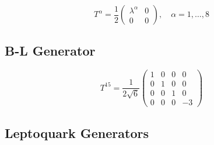 \documentclass[11pt,a4paper]{article}
\theoremstyle{definition}
\begin{document}
\begin{equation}
  \label{eq:su3-embedded}
  T^{\alpha} = \frac{1}{2} \begin{pmatrix} \lambda^{\alpha} & 0 \\ 0 & 0 \end{pmatrix}, \quad \alpha = 1, \ldots, 8
\end{equation}

\subsection{B-L Generator}
\label{subsec:bl-gen-explicit}

\begin{equation}
  \label{eq:t15-explicit}
  T^{15} = \frac{1}{2\sqrt{6}} \begin{pmatrix} 1&0&0&0\\0&1&0&0\\0&0&1&0\\0&0&0&-3 \end{pmatrix}
\end{equation}

\subsection{Leptoquark Generators}
\label{subsec:leptoquark-explicit}
\end{document}
